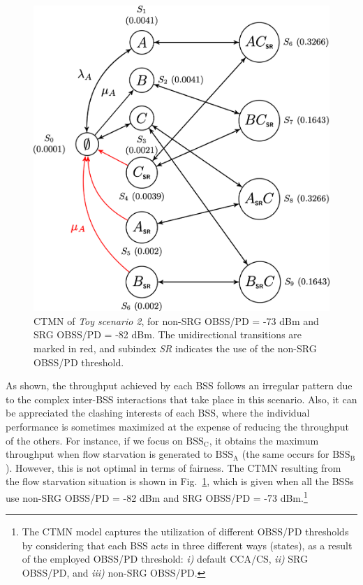 \documentclass{ieeeaccess}
\begin{document}
\begin{figure}[ht]
	\centering
	\includegraphics[width=.9\columnwidth]{ctmn_scenario_2}
	\caption{CTMN of \emph{Toy scenario 2}, for non-SRG OBSS/PD = -73 dBm and SRG OBSS/PD = -82 dBm. The unidirectional transitions are marked in red, and subindex \emph{SR} indicates the use of the non-SRG OBSS/PD threshold.}
	\label{fig:ctmn_scenario_2}
\end{figure}

As shown, the throughput achieved by each BSS follows an irregular pattern due to the complex inter-BSS interactions that take place in this scenario. Also, it can be appreciated the clashing interests of each BSS, where the individual performance is sometimes maximized at the expense of reducing the throughput of the others. For instance, if we focus on $\text{BSS}_\text{C}$, it obtains the maximum throughput when flow starvation is generated to $\text{BSS}_\text{A}$ (the same occurs for $\text{BSS}_\text{B}$). However, this is not optimal in terms of fairness. The CTMN resulting from the flow starvation situation is shown in Fig.~\ref{fig:ctmn_scenario_2}, which is given when all the BSSs use non-SRG OBSS/PD = -82 dBm and SRG OBSS/PD = -73 dBm.\footnote{The CTMN model captures the utilization of different OBSS/PD thresholds by considering that each BSS acts in three different ways (states), as a result of the employed OBSS/PD threshold: \emph{i)} default CCA/CS, \emph{ii)} SRG OBSS/PD, and \emph{iii)} non-SRG OBSS/PD.}
\end{document}
